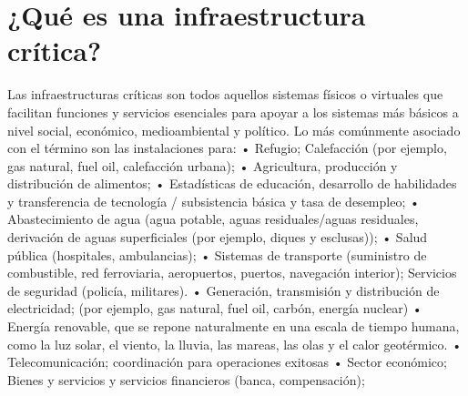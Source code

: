 \documentclass{article}
\begin{document}
\section{¿Qué es una infraestructura crítica?}
Las infraestructuras críticas son todos aquellos sistemas físicos o virtuales que facilitan funciones y servicios esenciales para apoyar a los sistemas más básicos a nivel social, económico, medioambiental y político.
\newline
\newline
Lo más comúnmente asociado con el término son las instalaciones para:
\newline
\newline
• Refugio; Calefacción (por ejemplo, gas natural, fuel oil, calefacción urbana);
\newline
\newline
• Agricultura, producción y distribución de alimentos;
\newline
\newline
• Estadísticas de educación, desarrollo de habilidades y transferencia de tecnología / subsistencia básica y tasa de desempleo;
\newline
\newline
• Abastecimiento de agua (agua potable, aguas residuales/aguas residuales, derivación de aguas superficiales (por ejemplo, diques y esclusas));
\newline
\newline
• Salud pública (hospitales, ambulancias);
\newline
\newline
• Sistemas de transporte (suministro de combustible, red ferroviaria, aeropuertos, puertos, navegación interior);
Servicios de seguridad (policía, militares).
\newline
\newline
• Generación, transmisión y distribución de electricidad; (por ejemplo, gas natural, fuel oil, carbón, energía nuclear)
\newline
\newline
• Energía renovable, que se repone naturalmente en una escala de tiempo humana, como la luz solar, el viento, la lluvia, las mareas, las olas y el calor geotérmico.
\newline
\newline
• Telecomunicación; coordinación para operaciones exitosas
\newline
\newline
• Sector económico; Bienes y servicios y servicios financieros (banca, compensación);
\end{document}
